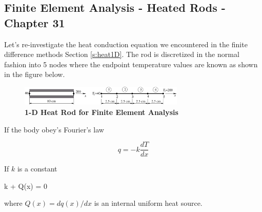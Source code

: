 \subsection{Finite Element Analysis - Heated Rods - Chapter 31}

Let's re-investigate the heat conduction equation we encountered in
the finite difference methods Section \ref{s:heat1D}. The rod is
discretized in the normal fashion into 5 nodes where the endpoint
temperature values are known as shown in the figure below.

\begin{figure}[H]
  \begin{center}
    \includegraphics[height=0.1\textwidth,width=0.7\textwidth]{Graphics/L07_F3.pdf}
  \end{center}
\caption{{\bf 1-D Heat Rod for Finite Element Analysis}}\label{f:heatconduction}
\end{figure}

If the body obey's Fourier's law 

\begin{equation}
q = -k \frac{dT}{dx}
\end{equation}

If $k$ is a constant

\beq
k + Q(x) = 0
\eeq

where $Q(x)=dq(x)/dx$ is an internal uniform heat source. 

